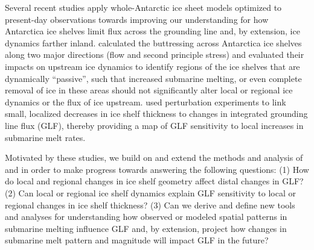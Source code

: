 \documentclass[review,oneside]{igs}
\begin{document}
Several recent studies apply whole-Antarctic ice sheet models optimized to present-day observations towards improving our understanding for how Antarctica ice shelves limit flux across the grounding line and, by extension, ice dynamics farther inland. \cite{furst2016} calculated the buttressing across Antarctica ice shelves along two major directions (flow and second principle stress) and evaluated their impacts on upstream ice dynamics to identify regions of the ice shelves that are dynamically ``passive'', such that increased submarine melting, or even complete removal of ice in these areas should not significantly alter local or regional ice dynamics or the flux of ice upstream. \cite{reese2018} used perturbation experiments to link small, localized decreases in ice shelf thickness to changes in integrated grounding line flux (GLF), thereby providing a map of GLF sensitivity to local increases in submarine melt rates. 


Motivated by these studies, we build on and extend the methods and analysis of \cite{furst2016} and \cite{reese2018} in order to make progress towards answering the following questions: 
(1) How do local and regional changes in ice shelf geometry affect distal changes in GLF? (2) Can local or regional ice shelf dynamics explain GLF sensitivity to local or regional changes in ice shelf thickness? (3) Can we derive and define new tools and analyses for understanding how observed or modeled spatial patterns in submarine melting influence GLF and, by extension, project how changes in submarine melt pattern and magnitude will impact GLF in the future?     
\end{document}
